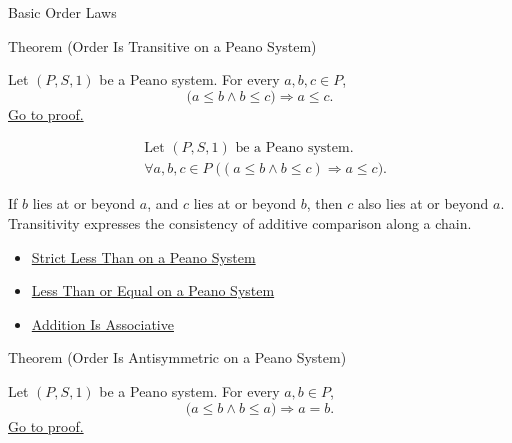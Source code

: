 \begin{topicbox}{Basic Order Laws}
\begin{theorembox}{Theorem (Order Is Transitive on a Peano System)}
\begin{theorem}
\label{thm:order-transitive-on-peano-system}
Let $(P,S,1)$ be a Peano system. For every $a,b,c \in P$,
\[
\bigl(a \le b \land b \le c\bigr)
\Longrightarrow
a \le c.
\]
\hyperref[prf:order-transitive-on-peano-system]{Go to proof.}
\end{theorem}
\end{theorembox}

\begin{remark*}
\[
\begin{aligned}
&\text{Let } (P,S,1) \text{ be a Peano system.}\\
&\forall a,b,c \in P\;
\bigl((a \le b \land b \le c) \Longrightarrow a \le c\bigr).
\end{aligned}
\]
\end{remark*}

\begin{remark*}[Interpretation]
If $b$ lies at or beyond $a$, and $c$ lies at or beyond $b$, then $c$ also
lies at or beyond $a$. Transitivity expresses the consistency of additive
comparison along a chain.
\end{remark*}

\begin{dependencies}
\begin{itemize}
  \item \hyperref[def:strict-less-than-on-peano-system]{Strict Less Than on a Peano System}
  \item \hyperref[def:less-than-or-equal-on-peano-system]{Less Than or Equal on a Peano System}
  \item \hyperref[thm:addition-associative]{Addition Is Associative}
\end{itemize}
\end{dependencies}

\begin{theorembox}{Theorem (Order Is Antisymmetric on a Peano System)}
\begin{theorem}
\label{thm:order-antisymmetric-on-peano-system}
Let $(P,S,1)$ be a Peano system. For every $a,b \in P$,
\[
\bigl(a \le b \land b \le a\bigr)
\Longrightarrow
a=b.
\]
\hyperref[prf:order-antisymmetric-on-peano-system]{Go to proof.}
\end{theorem}
\end{theorembox}


\end{topicbox}
